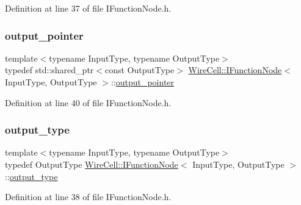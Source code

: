 Definition at line 37 of file I\+Function\+Node.\+h.

\mbox{\label{class_wire_cell_1_1_i_function_node_afc02f1ec60d31aacddf64963f9ca650b}} 
\subsubsection{\texorpdfstring{output\+\_\+pointer}{output\_pointer}}
{\footnotesize\ttfamily template$<$typename Input\+Type, typename Output\+Type$>$ \\
typedef std\+::shared\+\_\+ptr$<$const Output\+Type$>$ \hyperlink{class_wire_cell_1_1_i_function_node}{Wire\+Cell\+::\+I\+Function\+Node}$<$ Input\+Type, Output\+Type $>$\+::\hyperlink{class_wire_cell_1_1_i_function_node_afc02f1ec60d31aacddf64963f9ca650b}{output\+\_\+pointer}}



Definition at line 40 of file I\+Function\+Node.\+h.

\mbox{\label{class_wire_cell_1_1_i_function_node_a62445b7764d02391731ad3f262bdf6d8}} 
\subsubsection{\texorpdfstring{output\+\_\+type}{output\_type}}
{\footnotesize\ttfamily template$<$typename Input\+Type, typename Output\+Type$>$ \\
typedef Output\+Type \hyperlink{class_wire_cell_1_1_i_function_node}{Wire\+Cell\+::\+I\+Function\+Node}$<$ Input\+Type, Output\+Type $>$\+::\hyperlink{class_wire_cell_1_1_i_function_node_a62445b7764d02391731ad3f262bdf6d8}{output\+\_\+type}}



Definition at line 38 of file I\+Function\+Node.\+h.

\mbox{\label{class_wire_cell_1_1_i_function_node_a86cc51379625ab1584fd5de9688df262}} 
